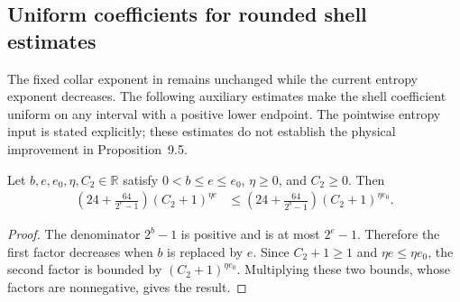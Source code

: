 \subsection{Uniform coefficients for rounded shell estimates}

The fixed collar exponent in \cite[Section~9, lines~693--703]{OpenAI2026AreaLaw}
remains unchanged while the current entropy exponent decreases. The following
auxiliary estimates make the shell coefficient uniform on any interval with
a positive lower endpoint. The pointwise entropy input is stated explicitly;
these estimates do not establish the physical improvement in Proposition~9.5.

\begin{lemma}
    \label{thm:area_law_uniform_rounded_shell_coefficient}
    \leanok
    Let $b,e,e_0,\eta,C_2\in\mathbb R$ satisfy $0<b\le e\le e_0$,
    $\eta\ge0$, and $C_2\ge0$. Then
    \begin{align}
        \left(24+\frac{64}{2^e-1}\right)(C_2+1)^{\eta e}
         & \le\left(24+\frac{64}{2^b-1}\right)(C_2+1)^{\eta e_0}.
    \end{align}
\end{lemma}
\begin{proof}
    \leanok
    The denominator $2^b-1$ is positive and is at most $2^e-1$.
    Therefore the first factor decreases when $b$ is replaced by $e$.
    Since $C_2+1\ge1$ and $\eta e\le\eta e_0$, the second factor
    is bounded by $(C_2+1)^{\eta e_0}$. Multiplying these two bounds,
    whose factors are nonnegative, gives the result.
\end{proof}

